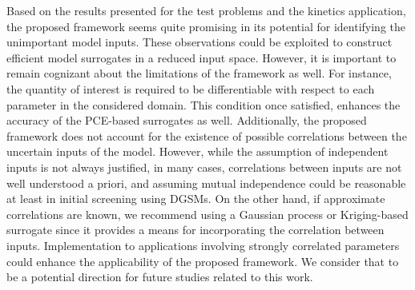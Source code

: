 Based on the results presented for the test problems and the kinetics
application, the proposed framework seems quite promising in its
potential for identifying the unimportant model inputs. 
These observations could be exploited to construct efficient model surrogates
in a reduced input space. However, it is important to remain cognizant
about the limitations of the framework as well. 
For instance, the quantity of interest is required to be differentiable with
respect to each parameter in the considered domain. This condition once
satisfied, enhances the accuracy of the PCE-based surrogates as well.  
Additionally, the proposed framework does not
account for the existence of possible correlations between the uncertain
inputs of the model. However, while the assumption of independent
inputs is not always justified, in many cases, correlations between
inputs are not well understood a priori, and assuming mutual independence
could be reasonable at least in initial screening using DGSMs. On the other
hand, if approximate correlations are known, we recommend using a Gaussian 
process or Kriging-based surrogate since it 
provides a means for incorporating the correlation between inputs.  
Implementation to applications involving strongly correlated parameters
could enhance the applicability of the proposed framework. 
We consider that to be a potential direction for future studies related
to this work. 
















